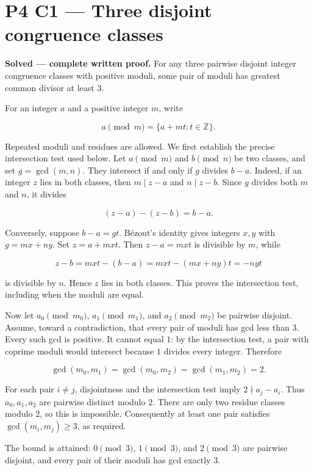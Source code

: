 \documentclass[11pt,a4paper]{article}
\begin{document}
\section{P4 C1 --- Three disjoint congruence classes}\label{p4-c1-three-disjoint-congruence-classes}

\textbf{Solved --- complete written proof.} For any three pairwise disjoint integer congruence classes with positive moduli, some pair of moduli has greatest common divisor at least \(3\).

For an integer \(a\) and a positive integer \(m\), write

\[
a\pmod m=\{a+mt:t\in\mathbb Z\}.
\]

Repeated moduli and residues are allowed. We first establish the precise intersection test used below. Let \(a\pmod m\) and \(b\pmod n\) be two classes, and set \(g=\gcd(m,n)\). They intersect if and only if \(g\) divides \(b-a\). Indeed, if an integer \(z\) lies in both classes, then \(m\mid z-a\) and \(n\mid z-b\). Since \(g\) divides both \(m\) and \(n\), it divides

\[
(z-a)-(z-b)=b-a.
\]

Conversely, suppose \(b-a=gt\). B\'{e}zout's identity gives integers \(x,y\) with \(g=mx+ny\). Set \(z=a+mxt\). Then \(z-a=mxt\) is divisible by \(m\), while

\[
z-b=mxt-(b-a)=mxt-(mx+ny)t=-nyt
\]

is divisible by \(n\). Hence \(z\) lies in both classes. This proves the intersection test, including when the moduli are equal.

Now let \(a_0\pmod{m_0}\), \(a_1\pmod{m_1}\), and \(a_2\pmod{m_2}\) be pairwise disjoint. Assume, toward a contradiction, that every pair of moduli has gcd less than \(3\). Every such gcd is positive. It cannot equal \(1\): by the intersection test, a pair with coprime moduli would intersect because \(1\) divides every integer. Therefore

\[
\gcd(m_0,m_1)=\gcd(m_0,m_2)=\gcd(m_1,m_2)=2.
\]

For each pair \(i\ne j\), disjointness and the intersection test imply \(2\nmid a_j-a_i\). Thus \(a_0,a_1,a_2\) are pairwise distinct modulo \(2\). There are only two residue classes modulo \(2\), so this is impossible. Consequently at least one pair satisfies \(\gcd(m_i,m_j)\ge3\), as required.

The bound is attained: \(0\pmod3\), \(1\pmod3\), and \(2\pmod3\) are pairwise disjoint, and every pair of their moduli has gcd exactly \(3\).
\end{document}
